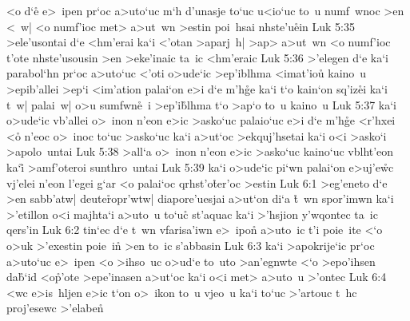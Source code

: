 <o
d`e\r{}
e>~ipen
pr`oc
a>uto`uc
m`h
d'unasje
to`uc
u<io`uc
to~u
numf~wnoc
>en
<~w|
<o
numf'ioc
met>
a>ut~wn
>estin
poi~hsai
nhste'u\r{e}in\bibvsend
{}
\vs Luk 5:35
>ele'usontai
d`e
<hm'erai
ka`i
<'otan
>aparj~h|
>ap>
a>ut~wn
<o
numf'ioc
t'ote
nhste'usousin
>en
>eke'inaic
ta~ic
<hm'eraic\bibvsend
\vs Luk 5:36
>'elegen
d`e
ka`i
parabol`hn
pr`oc
a>uto`uc
<'oti
o>ude`ic
>ep'iblhma
<imat'iou\r{}
kaino~u
>epib'allei
>ep`i
<im'ation
palai`on
e>i
d`e
m'h\r{g}e
ka`i
t`o
kain`on
sq'iz\r{e}i
ka`i
t~w|
palai~w|
o>u
sumfwn\r{e}~i
>ep'i\r{b}lhma
t`o
>ap`o
to~u
kaino~u\bibvsend
\vs Luk 5:37
ka`i
o>ude`ic
vb'allei
o>~inon
n'eon
e>ic
>asko`uc
palaio`uc
e>i
d`e
m'h\r{g}e
<r'hxei
<o\r{}
n'eoc
o>~inoc
to`uc
>asko`uc
ka`i
a>ut`oc
>ekquj'hsetai
ka`i
o<i
>asko`i
>apolo~untai\bibvsend
\vs Luk 5:38
>all`a
o>~inon
n'eon
e>ic
>asko`uc
kaino`uc
vblht'eon
ka`i\r{}
>amf'oteroi
sunthro~untai\bibvsend
\vs Luk 5:39
ka`i
o>ude`ic
pi`wn
palai`on
e>uj'e\r{w}c
vj'elei
n'eon
l'egei
g`ar
<o
palai`oc
qrhst'o\r{t}er'oc
>estin\bibvsend
\vs Luk 6:1
>eg'eneto
d`e
>en
sabb'atw|
deute\r{r}opr'wtw|
diapore'uesjai
a>ut`on
di`a
\r{t}~wn
spor'imwn
ka`i
>'etillon
o<i
majhta`i
a>uto~u
to`uc\r{}
st'aquac
ka`i
>'hsjion
y'wqontec
ta~ic
qers'in\bibvsend
\vs Luk 6:2
tin`ec
d`e
t~wn
vfarisa'iwn
e>~ipon\r{}
a>uto~ic
t'i
poie~ite
<`o
o>uk
>'exestin
poie~in\r{}
>en
to~ic
s'abbasin\bibvsend
\vs Luk 6:3
ka`i
>apokrije`ic
pr`oc
a>uto`uc
e>~ipen
<o
>ihso~uc
o>ud`e
to~uto
>an'egnwte
<`o
>epo'ihsen
da\r{b}`id
<o\r{p}'ote
>epe'inasen
a>ut`oc
ka`i
o<i
met>
a>uto~u
>'ontec\bibvsend
\vs Luk 6:4
<wc
e>is~hljen
e>ic
t`on
o>~ikon
to~u
vjeo~u
ka`i
to`uc
>'artouc
t~hc
proj'esewc
>'elaben\r{}
